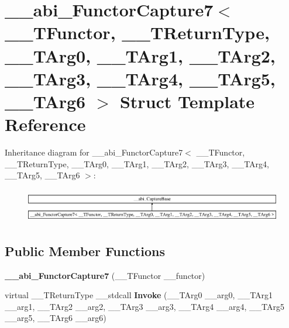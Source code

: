\hypertarget{struct____abi___functor_capture7}{}\section{\+\_\+\+\_\+abi\+\_\+\+Functor\+Capture7$<$ \+\_\+\+\_\+\+T\+Functor, \+\_\+\+\_\+\+T\+Return\+Type, \+\_\+\+\_\+\+T\+Arg0, \+\_\+\+\_\+\+T\+Arg1, \+\_\+\+\_\+\+T\+Arg2, \+\_\+\+\_\+\+T\+Arg3, \+\_\+\+\_\+\+T\+Arg4, \+\_\+\+\_\+\+T\+Arg5, \+\_\+\+\_\+\+T\+Arg6 $>$ Struct Template Reference}
\label{struct____abi___functor_capture7}
Inheritance diagram for \+\_\+\+\_\+abi\+\_\+\+Functor\+Capture7$<$ \+\_\+\+\_\+\+T\+Functor, \+\_\+\+\_\+\+T\+Return\+Type, \+\_\+\+\_\+\+T\+Arg0, \+\_\+\+\_\+\+T\+Arg1, \+\_\+\+\_\+\+T\+Arg2, \+\_\+\+\_\+\+T\+Arg3, \+\_\+\+\_\+\+T\+Arg4, \+\_\+\+\_\+\+T\+Arg5, \+\_\+\+\_\+\+T\+Arg6 $>$\+:\begin{figure}[H]
\begin{center}
\leavevmode
\includegraphics[height=1.505376cm]{df/df3/struct____abi___functor_capture7}
\end{center}
\end{figure}
\subsection*{Public Member Functions}
\begin{DoxyCompactItemize}
\item 
\mbox{\label{struct____abi___functor_capture7_ae349093d6e79b05bbfe20e3538b00706}} 
{\bfseries \+\_\+\+\_\+abi\+\_\+\+Functor\+Capture7} (\+\_\+\+\_\+\+T\+Functor \+\_\+\+\_\+functor)
\item 
\mbox{\label{struct____abi___functor_capture7_a4240d8a53af461833bfe41d15f51fc21}} 
virtual \+\_\+\+\_\+\+T\+Return\+Type \+\_\+\+\_\+stdcall {\bfseries Invoke} (\+\_\+\+\_\+\+T\+Arg0 \+\_\+\+\_\+arg0, \+\_\+\+\_\+\+T\+Arg1 \+\_\+\+\_\+arg1, \+\_\+\+\_\+\+T\+Arg2 \+\_\+\+\_\+arg2, \+\_\+\+\_\+\+T\+Arg3 \+\_\+\+\_\+arg3, \+\_\+\+\_\+\+T\+Arg4 \+\_\+\+\_\+arg4, \+\_\+\+\_\+\+T\+Arg5 \+\_\+\+\_\+arg5, \+\_\+\+\_\+\+T\+Arg6 \+\_\+\+\_\+arg6)
\end{DoxyCompactItemize}

